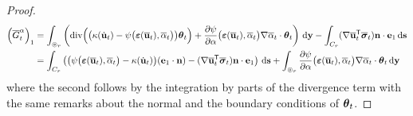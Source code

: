 \begin{proof}
\begin{align*}
\left(\overline{G}^\alpha_t\right)_1 &= \int_{\circledcirc_r}\left(\div\Bigl(\bigl(\kappa(\dot{\vec{u}}_t)-\psi\bigl(\eps(\overline{\vec{u}}_t),\overline{\alpha}_t\bigr)\bigr)\vtheta_t\Bigr)+\frac{\partial\psi}{\partial\alpha}\bigl(\eps(\overline{\vec{u}}_t),\overline{\alpha}_t\bigr)\nabla\overline{\alpha}_t\cdot\vtheta_t\right)\D{\vec{y}}-\int_{C_r}(\nabla\overline{\vec{u}}_t^\mT\overline{\sig}_t)\vec{n}\cdot\vec{e}_1\D{\vec{s}} \\
&= \int_{C_r}\left(\bigl(\psi\bigl(\eps(\overline{\vec{u}}_t),\overline{\alpha}_t\bigr)-\kappa(\dot{\vec{u}}_t)\bigr)(\vec{e}_1\cdot\vec{n})-(\nabla\overline{\vec{u}}_t^\mT\overline{\sig}_t)\vec{n}\cdot\vec{e}_1\right)\D{\vec{s}}+\int_{\circledcirc_r}\frac{\partial\psi}{\partial\alpha}\bigl(\eps(\overline{\vec{u}}_t),\overline{\alpha}_t\bigr)\nabla\overline{\alpha}_t\cdot\vtheta_t\D{\vec{y}}
\end{align*}
where the second follows by the integration by parts of the divergence term with the same remarks about the normal and the boundary conditions of $\vtheta_t$.


\end{proof}
